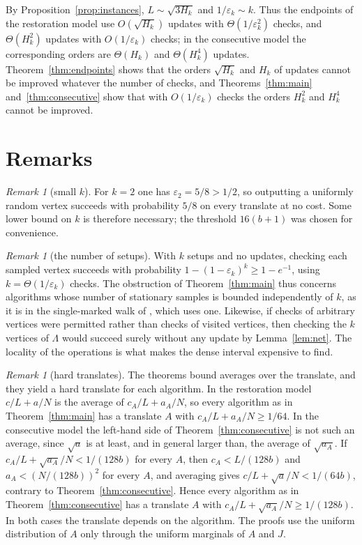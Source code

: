 \documentclass{amsart}
\theoremstyle{plain}
\theoremstyle{definition}
\theoremstyle{remark}
\newtheorem{remark}[theorem]{Remark}
\newcommand{\eps}{\varepsilon}
\begin{document}
By Proposition~\ref{prop:instances}, $L\sim\sqrt{3H_k}$ and $1/\eps_k\sim k$. Thus the endpoints of the restoration model use $O(\sqrt{H_k})$ updates with $\Theta(1/\eps_k^2)$ checks, and $\Theta(H_k^2)$ updates with $O(1/\eps_k)$ checks; in the consecutive model the corresponding orders are $\Theta(H_k)$ and $\Theta(H_k^4)$ updates. Theorem~\ref{thm:endpoints} shows that the orders $\sqrt{H_k}$ and $H_k$ of updates cannot be improved whatever the number of checks, and Theorems~\ref{thm:main} and~\ref{thm:consecutive} show that with $O(1/\eps_k)$ checks the orders $H_k^2$ and $H_k^4$ cannot be improved.

\section{Remarks}\label{sec:remarks}

\begin{remark}[small $k$]
For $k=2$ one has $\eps_2=5/8>1/2$, so outputting a uniformly random vertex succeeds with probability $5/8$ on every translate at no cost. Some lower bound on $k$ is therefore necessary; the threshold $16(b+1)$ was chosen for convenience.
\end{remark}

\begin{remark}[the number of setups]\label{rem:setups}
With $k$ setups and no updates, checking each sampled vertex succeeds with probability $1-(1-\eps_k)^k\ge 1-e^{-1}$, using $k=\Theta(1/\eps_k)$ checks. The obstruction of Theorem~\ref{thm:main} thus concerns algorithms whose number of stationary samples is bounded independently of $k$, as it is in the single-marked walk of \cite{AC}, which uses one. Likewise, if checks of arbitrary vertices were permitted rather than checks of visited vertices, then checking the $k$ vertices of $\Lambda$ would succeed surely without any update by Lemma~\ref{lem:net}. The locality of the operations is what makes the dense interval expensive to find.
\end{remark}

\begin{remark}[hard translates]
The theorems bound averages over the translate, and they yield a hard translate for each algorithm. In the restoration model $c/L+a/N$ is the average of $c_A/L+a_A/N$, so every algorithm as in Theorem~\ref{thm:main} has a translate $A$ with $c_A/L+a_A/N\ge 1/64$. In the consecutive model the left-hand side of Theorem~\ref{thm:consecutive} is not such an average, since $\sqrt a$ is at least, and in general larger than, the average of $\sqrt{a_A}$. If $c_A/L+\sqrt{a_A}/N<1/(128b)$ for every $A$, then $c_A<L/(128b)$ and $a_A<(N/(128b))^2$ for every $A$, and averaging gives $c/L+\sqrt a/N<1/(64b)$, contrary to Theorem~\ref{thm:consecutive}. Hence every algorithm as in Theorem~\ref{thm:consecutive} has a translate $A$ with $c_A/L+\sqrt{a_A}/N\ge 1/(128b)$. In both cases the translate depends on the algorithm. The proofs use the uniform distribution of $A$ only through the uniform marginals of $A$ and $J$.
\end{remark}
\end{document}
